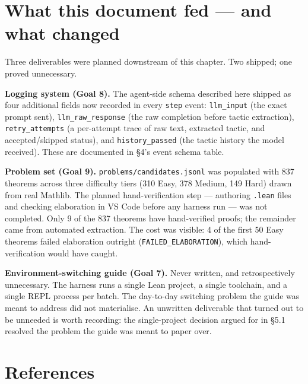\section{What this document fed --- and what changed}

Three deliverables were planned downstream of this chapter.
Two shipped; one proved unnecessary.

\textbf{Logging system (Goal 8).}
The agent-side schema described here shipped as four additional fields now recorded in every \texttt{step} event: \texttt{llm\_input} (the exact prompt sent), \texttt{llm\_raw\_response} (the raw completion before tactic extraction), \texttt{retry\_attempts} (a per-attempt trace of raw text, extracted tactic, and accepted/skipped status), and \texttt{history\_passed} (the tactic history the model received).
These are documented in \S4's event schema table.

\textbf{Problem set (Goal 9).}
\texttt{problems/candidates.jsonl} was populated with 837 theorems across three difficulty tiers (310 Easy, 378 Medium, 149 Hard) drawn from real Mathlib.
The planned hand-verification step --- authoring \texttt{.lean} files and checking elaboration in VS Code before any harness run --- was not completed.
Only 9 of the 837 theorems have hand-verified proofs; the remainder came from automated extraction.
The cost was visible: 4 of the first 50 Easy theorems failed elaboration outright (\texttt{FAILED\_ELABORATION}), which hand-verification would have caught.

\textbf{Environment-switching guide (Goal 7).}
Never written, and retrospectively unnecessary.
The harness runs a single Lean project, a single toolchain, and a single REPL process per batch.
The day-to-day switching problem the guide was meant to address did not materialise.
An unwritten deliverable that turned out to be unneeded is worth recording: the single-project decision argued for in \S5.1 resolved the problem the guide was meant to paper over.

\section{References}


